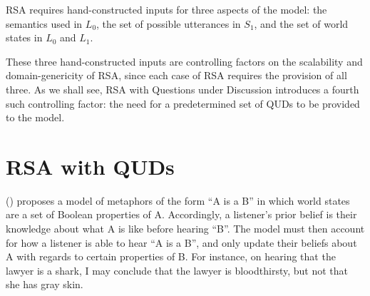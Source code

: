 \documentclass[10pt,letterpaper,twocolumn]{article}
\begin{document}


RSA requires hand-constructed inputs for three aspects of the model: the semantics used in $L_0$, the set of possible utterances in $S_1$, and the set of world states in $L_0$ and $L_1$.


These three hand-constructed inputs are controlling factors on the scalability and domain-genericity of RSA, since each case of RSA requires the provision of all three. As we shall see, RSA with Questions under Discussion introduces a fourth such controlling factor: the need for a predetermined set of QUDs to be provided to the model.

\section{RSA with QUDs} \label{rsawithqud}







(\cite{kao}) proposes a model of metaphors of the form ``A is a B'' in which world states are a set of Boolean properties of A. Accordingly, a listener's prior belief is their knowledge about what A is like before hearing ``B''. The model must then account for how a listener is able to hear ``A is a B'', and only update their beliefs about A with regards to certain properties of B. For instance, on hearing that the lawyer is a shark, I may conclude that the lawyer is bloodthirsty, but not that she has gray skin.  
\end{document}
